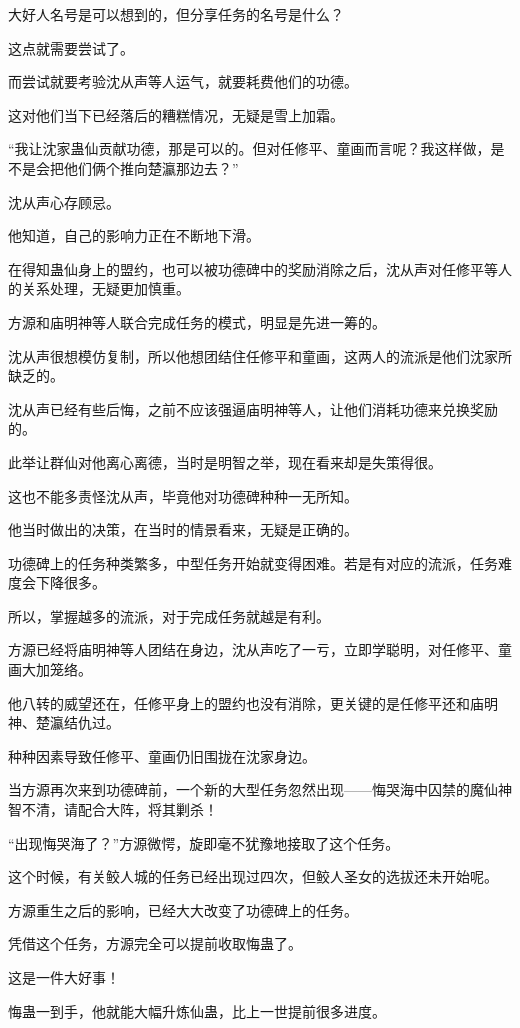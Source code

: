 \begin{this_body}
大好人名号是可以想到的，但分享任务的名号是什么？

这点就需要尝试了。

而尝试就要考验沈从声等人运气，就要耗费他们的功德。

这对他们当下已经落后的糟糕情况，无疑是雪上加霜。

“我让沈家蛊仙贡献功德，那是可以的。但对任修平、童画而言呢？我这样做，是不是会把他们俩个推向楚瀛那边去？”

沈从声心存顾忌。

他知道，自己的影响力正在不断地下滑。

在得知蛊仙身上的盟约，也可以被功德碑中的奖励消除之后，沈从声对任修平等人的关系处理，无疑更加慎重。

方源和庙明神等人联合完成任务的模式，明显是先进一筹的。

沈从声很想模仿复制，所以他想团结住任修平和童画，这两人的流派是他们沈家所缺乏的。

沈从声已经有些后悔，之前不应该强逼庙明神等人，让他们消耗功德来兑换奖励的。

此举让群仙对他离心离德，当时是明智之举，现在看来却是失策得很。

这也不能多责怪沈从声，毕竟他对功德碑种种一无所知。

他当时做出的决策，在当时的情景看来，无疑是正确的。

功德碑上的任务种类繁多，中型任务开始就变得困难。若是有对应的流派，任务难度会下降很多。

所以，掌握越多的流派，对于完成任务就越是有利。

方源已经将庙明神等人团结在身边，沈从声吃了一亏，立即学聪明，对任修平、童画大加笼络。

他八转的威望还在，任修平身上的盟约也没有消除，更关键的是任修平还和庙明神、楚瀛结仇过。

种种因素导致任修平、童画仍旧围拢在沈家身边。

当方源再次来到功德碑前，一个新的大型任务忽然出现——悔哭海中囚禁的魔仙神智不清，请配合大阵，将其剿杀！

“出现悔哭海了？”方源微愕，旋即毫不犹豫地接取了这个任务。

这个时候，有关鲛人城的任务已经出现过四次，但鲛人圣女的选拔还未开始呢。

方源重生之后的影响，已经大大改变了功德碑上的任务。

凭借这个任务，方源完全可以提前收取悔蛊了。

这是一件大好事！

悔蛊一到手，他就能大幅升炼仙蛊，比上一世提前很多进度。

\end{this_body}

